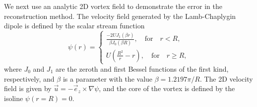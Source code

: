 \documentclass[final,1p,times]{elsarticle}
\begin{document}
We next use an analytic 2D vortex field to demonstrate the error in the reconstruction method. The velocity field generated by the Lamb-Chaplygin dipole is defined by the scalar stream function
\begin{equation}
    \psi(r) = \begin{cases}
    \frac{-2UJ_1(\beta r)}{\beta J_0(\beta R)}, \quad \text{for} \quad r < R,\\
    U\left(\frac{R^2}{r}-r\right), \quad \text{for} \quad r \ge R,    \end{cases}
\end{equation}
where $J_0$ and $J_1$ are the zeroth and first Bessel functions of the first kind, respectively, and $\beta$ is a parameter with the value $\beta=1.2197\pi/R$. The 2D velocity field is given by $\vec{u} = -\vec{e}_z\times \nabla \psi$, and the core of the vortex is defined by the isoline $\psi(r=R)=0$.

%     
\end{document}
